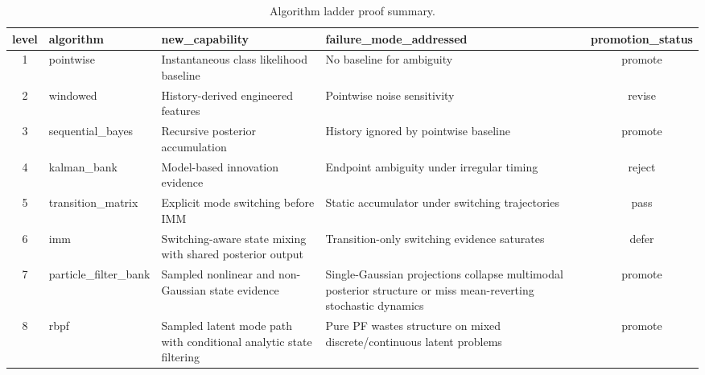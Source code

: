 \begin{table}[htbp]
\centering
\caption{Algorithm ladder proof summary.}
\label{tab:algorithm_ladder}
\begin{tabularx}{\textwidth}{clXXc}
\toprule
level & algorithm & new\_capability & failure\_mode\_addressed & promotion\_status \\
\midrule
1 & pointwise & Instantaneous class likelihood baseline & No baseline for ambiguity & promote \\
2 & windowed & History-derived engineered features & Pointwise noise sensitivity & revise \\
3 & sequential\_bayes & Recursive posterior accumulation & History ignored by pointwise baseline & promote \\
4 & kalman\_bank & Model-based innovation evidence & Endpoint ambiguity under irregular timing & reject \\
5 & transition\_matrix & Explicit mode switching before IMM & Static accumulator under switching trajectories & pass \\
6 & imm & Switching-aware state mixing with shared posterior output & Transition-only switching evidence saturates & defer \\
7 & particle\_filter\_bank & Sampled nonlinear and non-Gaussian state evidence & Single-Gaussian projections collapse multimodal posterior structure or miss mean-reverting stochastic dynamics & promote \\
8 & rbpf & Sampled latent mode path with conditional analytic state filtering & Pure PF wastes structure on mixed discrete/continuous latent problems & promote \\
\bottomrule
\end{tabularx}
\end{table}